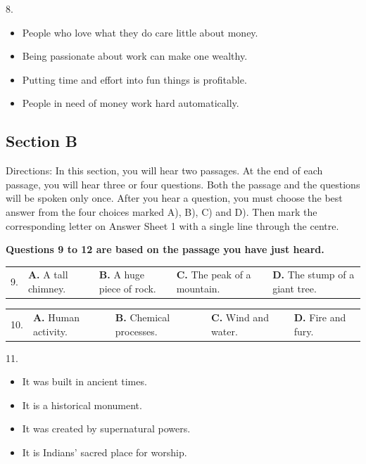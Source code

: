 \documentclass[UTF8,11pt]{ctexart}
\begin{document}
8.


\begin{itemize}[leftmargin=2em,itemsep=.2em,topsep=.4em]\item[A.] People who love what they do care little about money.
\item[B.] Being passionate about work can make one wealthy.
\item[C.] Putting time and effort into fun things is profitable.
\item[D.] People in need of money work hard automatically.
\end{itemize}

\subsection*{\textbf{Section B}}


Directions: In this section, you will hear two passages. At the end of each passage, you will hear three or four questions. Both the passage and the questions will be spoken only once. After you hear a question, you must choose the best answer from the four choices marked A), B), C) and D). Then mark the corresponding letter on Answer Sheet 1 with a single line through the centre.


\textbf{Questions 9 to 12 are based on the passage you have just heard.}


\noindent\begin{tabularx}{\linewidth}{@{}lXXXX@{}}9. & \textbf{A.} A tall chimney. & \textbf{B.} A huge piece of rock. & \textbf{C.} The peak of a mountain. & \textbf{D.} The stump of a giant tree.\\\end{tabularx}\par

\noindent\begin{tabularx}{\linewidth}{@{}lXXXX@{}}10. & \textbf{A.} Human activity. & \textbf{B.} Chemical processes. & \textbf{C.} Wind and water. & \textbf{D.} Fire and fury.\\\end{tabularx}\par

11.


\begin{itemize}[leftmargin=2em,itemsep=.2em,topsep=.4em]\item[A.] It was built in ancient times.
\item[B.] It is a historical monument.
\item[C.] It was created by supernatural powers.
\item[D.] It is Indians’ sacred place for worship.
\end{itemize}
\end{document}
